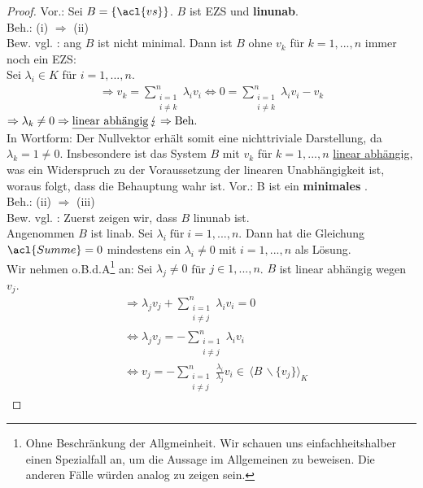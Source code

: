 \begin{proof}  
Vor.: Sei $B = \{\acl{vs}\}$. $B$ ist \acl{EZS} und \textbf{\acl{linunab}}.
\\ Beh.: (i) $\Rightarrow$ (ii) 
\\ Bew.  vgl. \cite[S. 41, 9.16 (a) $\Rightarrow$ (b)]{Skript}: \acl{ang} $B$ ist nicht minimal. Dann ist $B$ ohne $v_k$ für $k=1,...,n$ immer noch ein \acl{EZS}:
\\ Sei $\lambda_i \in K$ für $i=1,...,n$.
\begin{align*}\Rightarrow v_k = \sum \limits_{\substack{i=1\\i\not=k}}^{n}\lambda_i v_i
\Leftrightarrow 0 = \sum \limits_{\substack{i=1\\i\not=k}}^{n}\lambda_i v_i - v_k 
\end{align*}
\(\Rightarrow \lambda_k \not= 0 \Rightarrow \text{\underline{linear abhängig}} \, \lightning
\Rightarrow \text{Beh.} \)
\\In Wortform: Der Nullvektor erhält somit eine nichttriviale Darstellung, da $\lambda_k=1\not=0$. Insbesondere ist das System $B$ mit $v_k$ für $k=1,...,n$ \underline{linear abhängig}, was ein Widerspruch zu der Voraussetzung der linearen Unabhängigkeit ist, woraus folgt, dass die Behauptung wahr ist.
\newpage
\noindent Vor.: B ist ein \textbf{minimales }.
\\ Beh.: (ii) $\Rightarrow$ (iii) 
\\ Bew. vgl. \cite[S. 41, 9.16 (b) $\Rightarrow$ (c)]{Skript}: Zuerst zeigen wir, dass $B$ \acl{linunab} ist.
\\ Angenommen $B$ ist \acl{linab}. Sei \(\lambda_i \; \text{für} \; i=1,...,n\). Dann hat die Gleichung \(\acl{Summe}=0\) mindestens ein $\lambda_i\not=0$ mit $i=1,...,n$ als Lösung.
\\Wir nehmen o.B.d.A\footnote{Ohne Beschränkung der Allgmeinheit. Wir schauen uns einfachheitshalber einen Spezialfall an, um die Aussage im Allgemeinen zu beweisen. Die anderen Fälle würden analog zu zeigen sein.} an:
Sei $\lambda_j \not= 0$ für $j \in {1,...,n}$. $B$ ist linear abhängig wegen $v_j$. 
\begin{align*}
&\Rightarrow \lambda_j v_j + \sum\limits_{\substack{i=1\\i\not=j}}^{n} \lambda_i v_i = 0
\\ &\Leftrightarrow \lambda_j v_j = - \sum\limits_{\substack{i=1\\i\not=j}}^{n} \lambda_i v_i
\\ &\Leftrightarrow v_j = - \sum\limits_{\substack{i=1\\i\not=j}}^{n} \frac{\lambda_i}{\lambda_j} v_i \in\, \langle B\, \backslash \{v_j\}\rangle_K

\end{align*}
\end{proof}
